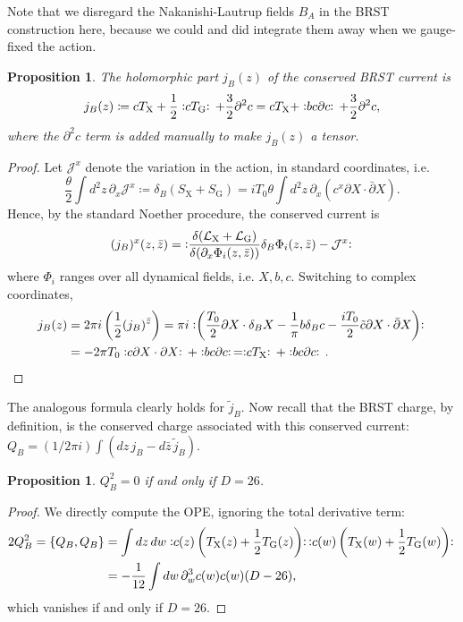 \documentclass{report}
\theoremstyle{plain}
\newtheorem{proposition}[theorem]{Proposition}
\theoremstyle{definition}
\theoremstyle{remark}
\newcommand{\di}{\partial}
\newcommand{\NO}[1]{\vcentcolon\mathrel{#1}\vcentcolon\,}
\newcommand{\cJ}{\mathcal{J}}
\newcommand{\cL}{\mathcal{L}}
\newcommand{\fder}[2]{\frac{\delta #1}{\delta #2}}
\newcommand{\bdi}{\bar{\di}}
\begin{document}
Note that we disregard the Nakanishi-Lautrup fields $B_A$ in the BRST
construction here, because we could and did integrate them away when
we gauge-fixed the action.

\begin{proposition}
  The holomorphic part $j_B(z)$ of the conserved BRST current is
  \[ j_B(z) \coloneqq c T_{\text{X}} + \frac{1}{2} \NO{c T_{\text{G}}} + \frac{3}{2} \di^2 c = c T_{\text{X}} + \NO{bc\di c} + \frac{3}{2} \di^2 c, \]
  where the $\di^2 c$ term is added manually to make $j_B(z)$ a
  tensor.
\end{proposition}

\begin{proof}
  Let $\cJ^x$ denote the variation in the action, in standard
  coordinates, i.e.
  \[ \frac{\theta}{2} \int d^2z \, \di_x \cJ^x \coloneqq \delta_B(S_{\text{X}} + S_{\text{G}}) = iT_0\theta \int d^2z \, \di_x(c^x \di X \cdot \bdi X). \]
  Hence, by the standard Noether procedure, the conserved current is
  \[ (j_B)^x(z,\bar{z}) = \; \NO{\fder{(\cL_{\text{X}} + \cL_{\text{G}})}{(\di_x \Phi_i(z,\bar{z}))} \delta_B \Phi_i(z,\bar{z}) - \cJ^x} \]
  where $\Phi_i$ ranges over all dynamical fields, i.e. $X, b, c$.
  Switching to complex coordinates,
  \begin{align*}
    j_B(z) &= 2\pi i \left(\frac{1}{2} (j_B)^{\bar{z}}\right) = \pi i \NO{\left(\frac{T_0}{2} \di X \cdot \delta_B X - \frac{1}{\pi} b \delta_B c - \frac{iT_0}{2} \tilde{c} \di X \cdot \bdi X\right)} \\
    &= -2\pi T_0 \NO{c \di X \cdot \di X} + \NO{bc \di c} = \NO{c T_{\text{X}}} + \NO{bc \di c}. \qedhere
  \end{align*}
\end{proof}

The analogous formula clearly holds for $\tilde{j}_B$. Now recall that
the BRST charge, by definition, is the conserved charge associated
with this conserved current: $Q_B = (1/2\pi i) \int (dz \, j_B -
d\bar{z} \, \tilde{j}_B)$.

\begin{proposition}
  $Q_B^2 = 0$ if and only if $D = 26$.
\end{proposition}

\begin{proof}
  We directly compute the OPE, ignoring the total derivative term:
  \begin{align*}
    2Q_B^2 = \{Q_B, Q_B\}
    &= \int dz \, dw \NO{c(z) \left(T_{\text{X}}(z) + \frac{1}{2} T_{\text{G}}(z)\right)} \NO{c(w) \left(T_{\text{X}}(w) + \frac{1}{2} T_{\text{G}}(w)\right)} \\
    &= -\frac{1}{12} \int dw \, \di_w^3c(w) c(w) (D - 26),
  \end{align*}
  which vanishes if and only if $D = 26$.
\end{proof}
\end{document}
